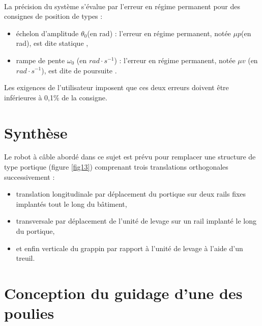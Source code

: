 ~\

La précision du système s’évalue par l’erreur en régime permanent pour des consignes de position de types :
\begin{itemize}
 \item échelon d’amplitude $\theta_0$(en rad) : l’erreur en régime permanent, notée $\mu p$(en rad), est dite \og statique \fg,
 \item rampe de pente $\omega_0$ (en $rad\cdot s^{-1}$) : l’erreur en régime permanent, notée $\mu v$ (en $rad\cdot s^{-1}$), est dite \og de poursuite \fg.
\end{itemize}

Les exigences de l’utilisateur imposent que ces deux erreurs doivent être inférieures à 0,1\% de la consigne.


\section{Synthèse}

Le robot à câble abordé dans ce sujet est prévu pour remplacer une structure de type portique (figure \ref{fig13}) comprenant trois translations orthogonales successivement :
\begin{itemize}
 \item translation longitudinale par déplacement du portique sur deux rails fixes implantés tout le long du bâtiment,
 \item transversale par déplacement de l’unité de levage sur un rail implanté le long du portique,
 \item et enfin verticale du grappin par rapport à l’unité de levage à l’aide d’un treuil.
\end{itemize}



\newpage

\section{Conception du guidage d'une des poulies}

